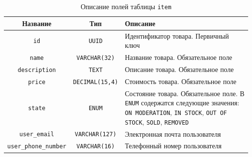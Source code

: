 \documentclass[a4paper,14pt]{extarticle}
\begin{document}
\begin{center}
    \begin{longtable}{|c|c|>{\centering\arraybackslash}m{7.5cm}|}
        \caption{Описание полей таблицы \texttt{item}}
        \label{tab:item}
        \\
        \hline
        \textbf{Название}            & \textbf{Тип}           & \textbf{Описание}                                                                                                                                                                     \\
        \hline
        \texttt{id}                  & \texttt{UUID}          & Идентификатор товара. Первичный ключ                                                                                                                                                  \\
        \hline
        \texttt{name}                & \texttt{VARCHAR(32)}   & Название товара. Обязательное поле                                                                                                                                                    \\
        \hline
        \texttt{description}         & \texttt{TEXT}          & Описание товара. Обязательное поле                                                                                                                                                    \\
        \hline
        \texttt{price}               & \texttt{DECIMAL(15,4)} & Стоимость товара. Обязательное поле                                                                                                                                                   \\
        \hline
        \texttt{state}               & \texttt{ENUM}          & Состояние товара. Обязательное поле. В \texttt{ENUM} содержатся следующие значения: \texttt{ON MODERATION}, \texttt{IN STOCK}, \texttt{OUT OF STOCK}, \texttt{SOLD}, \texttt{REMOVED} \\
        \hline
        \texttt{user\_email}         & \texttt{VARCHAR(127)}  & Электронная почта пользователя                                                                                                                                                        \\
        \hline
        \texttt{user\_phone\_number} & \texttt{VARCHAR(16)}   & Телефонный номер пользователя                                                                                                                                                         \\

\end{longtable}
\end{center}
\end{document}
